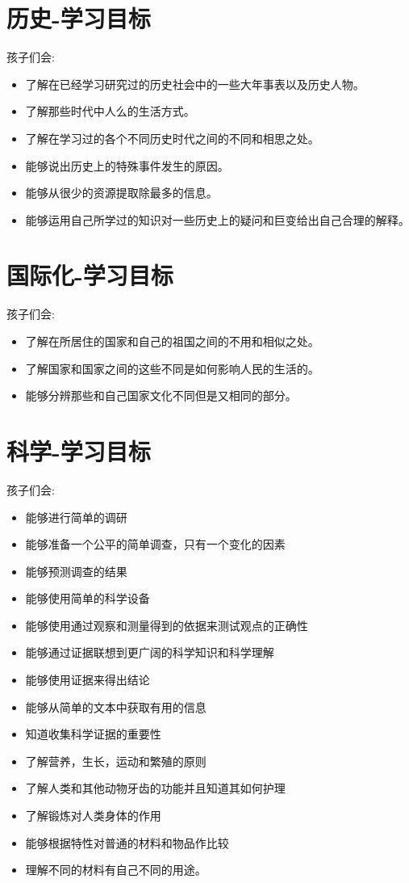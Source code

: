 \section{历史-学习目标}
     孩子们会:\par
     \begin{itemize}
       \item 了解在已经学习研究过的历史社会中的一些大年事表以及历史人物。
       \item 了解那些时代中人么的生活方式。
       \item 了解在学习过的各个不同历史时代之间的不同和相思之处。
       \item 能够说出历史上的特殊事件发生的原因。
       \item 能够从很少的资源提取除最多的信息。
       \item 能够运用自己所学过的知识对一些历史上的疑问和巨变给出自己合理的解释。
     \end{itemize}  

\section{国际化-学习目标}
     孩子们会:\par
     \begin{itemize}
       \item 了解在所居住的国家和自己的祖国之间的不用和相似之处。
       \item 了解国家和国家之间的这些不同是如何影响人民的生活的。
       \item 能够分辨那些和自己国家文化不同但是又相同的部分。
     \end{itemize} 

\section{科学-学习目标}
     孩子们会:\par
     \begin{itemize}
       \item 能够进行简单的调研
       \item 能够准备一个公平的简单调查，只有一个变化的因素
       \item 能够预测调查的结果
       \item 能够使用简单的科学设备
       \item 能够使用通过观察和测量得到的依据来测试观点的正确性
       \item 能够通过证据联想到更广阔的科学知识和科学理解
       \item 能够使用证据来得出结论
       \item 能够从简单的文本中获取有用的信息      
       \item 知道收集科学证据的重要性
       \item 了解营养，生长，运动和繁殖的原则
       \item 了解人类和其他动物牙齿的功能并且知道其如何护理
       \item 了解锻炼对人类身体的作用
       \item 能够根据特性对普通的材料和物品作比较
       \item 理解不同的材料有自己不同的用途。
     \end{itemize} 

